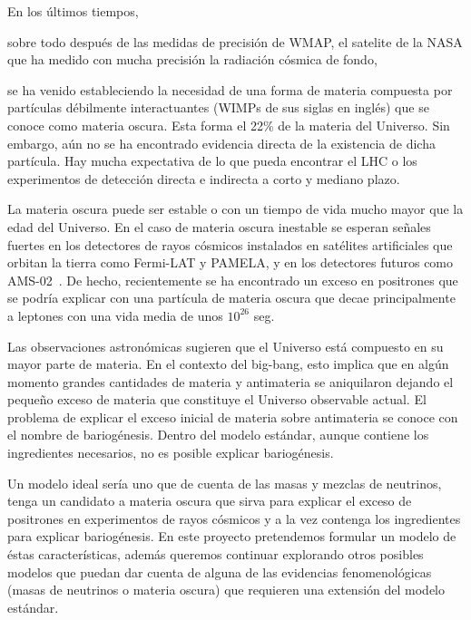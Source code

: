 En los últimos tiempos,
\begin{soloproyecto}
sobre todo después de las medidas de
precisión de WMAP, el satelite de la NASA que ha medido con mucha
precisión la radiación cósmica de fondo,  
\end{soloproyecto}
se ha venido estableciendo la necesidad de una forma de materia
compuesta por partículas débilmente interactuantes (WIMPs de sus
siglas en inglés) que se conoce como materia oscura. Esta forma el
22\% de la materia del Universo. Sin embargo, aún no se ha encontrado
evidencia directa de la existencia de dicha partícula. Hay mucha
expectativa de lo que pueda encontrar el LHC o los experimentos de
detección directa e indirecta a corto y mediano plazo.

La materia oscura puede ser estable o con un tiempo de vida mucho
mayor que la edad del Universo. En el caso de materia oscura inestable
se esperan señales fuertes en los detectores de rayos cósmicos
instalados en satélites artificiales que orbitan la tierra como
Fermi-LAT y PAMELA, y en los detectores futuros como
AMS-02~\cite{ams:2009}. De hecho, recientemente se ha encontrado un
exceso en positrones \cite{Adriani:2008zr} que se podría explicar con
una partícula de materia oscura que decae principalmente a leptones
con una vida media de unos $10^{26}$ seg.

\begin{evaluador}
Las observaciones astronómicas sugieren que el Universo está compuesto
en su mayor parte de materia. En el contexto del big-bang, esto
implica que en algún momento grandes cantidades de materia y
antimateria se aniquilaron dejando el pequeño exceso de materia que
constituye el Universo observable actual. El problema de explicar el
exceso inicial de materia sobre antimateria se conoce con el nombre de
bariogénesis. Dentro del modelo estándar, aunque contiene los
ingredientes necesarios, no es posible explicar bariogénesis.
\end{evaluador}
Un modelo ideal sería uno que de cuenta de las masas y mezclas de
neutrinos, tenga un candidato a materia oscura que sirva para explicar
el exceso de positrones en experimentos de rayos cósmicos y a la vez
contenga los ingredientes para explicar bariogénesis.  En este
proyecto pretendemos formular un modelo de éstas características,
además queremos continuar explorando otros posibles modelos que puedan
dar cuenta de alguna de las evidencias fenomenológicas (masas de
neutrinos o materia oscura) que requieren una extensión del modelo
estándar.



